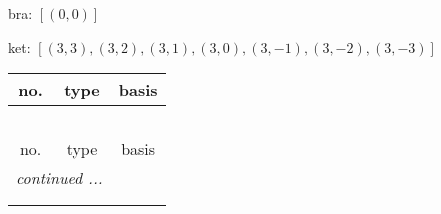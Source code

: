 \documentclass[fleqn,8pt,landscape]{jsarticle}
\begin{document}
bra: $[(0,0)]$

\noindent
ket: $[(3,3),(3,2),(3,1),(3,0),(3,-1),(3,-2),(3,-3)]$
\begin{center}
\renewcommand{\arraystretch}{1.6}
\begin{longtable}{ccc}
 \hline \hline
no. & type & basis \\ \hline \endfirsthead

\multicolumn{2}{l}{\tablename\ \thetable{}} \\
 \hline \hline
no. & type & basis \\ \hline \endhead

 \hline \hline
\multicolumn{2}{r}{\footnotesize\it continued ...} \\ \endfoot

 \hline \hline
\multicolumn{2}{r}{} \\ \endlastfoot


\end{longtable}
\end{center}
\end{document}
